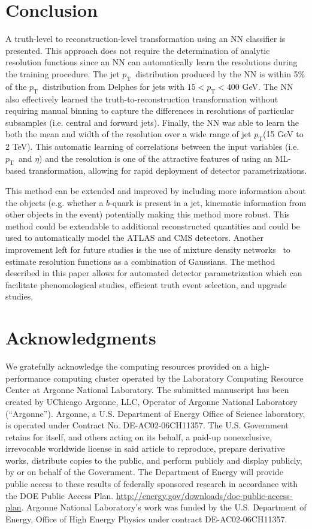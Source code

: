 \documentclass[showpacs,showkeys,preprint,prd,nofootinbib,linenumbers,12pt,superscriptaddress]{revtex4-1}
\def\pt{\ensuremath{p_{\mathrm{T}}}}
\begin{document}
\section{Conclusion}
A truth-level to reconstruction-level transformation using an NN classifier is presented. This approach does not require the determination of analytic resolution functions since an NN can automatically learn the resolutions during the training procedure. The jet \pt\ distribution produced by the NN is within 5\% of the \pt\ distribution from Delphes for jets with $15 < \pt < 400$ GeV. The NN also effectively learned the truth-to-reconstruction transformation without requiring manual binning to capture the differences in resolutions of particular subsamples (i.e. central and forward jets). Finally, the NN was able to learn the both the mean and width of the resolution over a wide range of jet \pt (15 GeV to 2 TeV). This automatic learning of correlations between the input variables (i.e. \pt\ and $\eta$) and the resolution is one of the attractive features of using an ML-based transformation, allowing for rapid deployment of detector parametrizations.

This method can be extended and improved by including more information about the objects (e.g. whether a $b$-quark is present in a jet, kinematic information from other objects in the event) potentially making this method more robust. This method could be extendable to additional reconstructed quantities and could be used to automatically model the ATLAS and CMS detectors. Another improvement left for future studies is the use of mixture density networks~\cite{Bishop94mixturedensity} to estimate resolution functions as a combination of Gaussians. The method described in this paper allows for automated detector parametrization which can facilitate phenomological studies, efficient truth event selection, and upgrade studies.

\section*{Acknowledgments}
We gratefully acknowledge the computing resources provided on a
high-performance computing cluster operated by the
Laboratory Computing Resource Center at Argonne National Laboratory.
The submitted manuscript has been created by UChicago Argonne, LLC,
Operator of Argonne National Laboratory (“Argonne”). Argonne, a U.S.
Department of Energy Office of Science laboratory, is operated under
Contract No. DE-AC02-06CH11357. The U.S. Government retains for itself,
and others acting on its behalf, a paid-up nonexclusive, irrevocable
worldwide license in said article to reproduce, prepare derivative works,
distribute copies to the public, and perform publicly and display
publicly, by or on behalf of the Government.
The Department of Energy will provide public access to these results of
federally sponsored research in accordance with the
DOE Public Access Plan.
\url{http://energy.gov/downloads/doe-public-access-plan}. Argonne
National Laboratory’s work was
funded by the U.S. Department of Energy, Office of High Energy Physics
under contract DE-AC02-06CH11357.


\end{document}
